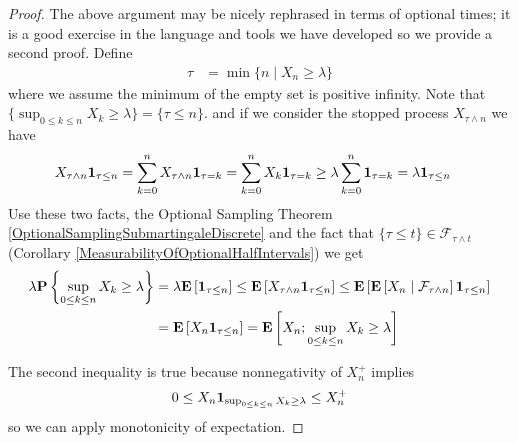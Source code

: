 \begin{proof}
The above argument may be nicely rephrased in terms of optional times; it is a good exercise in the language and tools we have developed so we provide a second proof.  Define
\begin{align*}
\tau &= \min \lbrace  n \mid X_n \geq \lambda \rbrace
\end{align*}
where we assume the minimum of the empty set is positive infinity. 
Note that $\lbrace \sup_{0 \leq k \leq n} X_k \geq \lambda
\rbrace = \lbrace \tau \leq n \rbrace$.  and if we consider the stopped
process $X_{\tau \wedge n}$ we have
\begin{align*}
X_{\tau  \wedge n} \characteristic{\tau \leq n} &= \sum_{k=0}^n X_{\tau \wedge n}
\characteristic{\tau = k}  = \sum_{k=0}^n X_k
\characteristic{\tau = k} \geq \lambda \sum_{k=0}^n
\characteristic{\tau = k} = \lambda \characteristic{\tau \leq n} 
\end{align*}
Use these two facts, the Optional Sampling Theorem \ref{OptionalSamplingSubmartingaleDiscrete} and the fact that $\lbrace \tau \leq t \rbrace \in \mathcal{F}_{\tau \wedge t}$ (Corollary \ref{MeasurabilityOfOptionalHalfIntervals}) we get
\begin{align*}
\lambda \probability{\sup_{0 \leq k \leq n} X_k \geq \lambda} &= \lambda \expectation{\characteristic{\tau \leq n}} 
\leq \expectation{X_{\tau \wedge n} \characteristic{\tau \leq n}} 
\leq \expectation{\cexpectationlong{\mathcal{F}_{\tau \wedge n}} {X_{n}} \characteristic{\tau \leq n}} \\
&=\expectation{X_{n} \characteristic{\tau \leq n}} = \expectation {X_n; \sup_{0 \leq k \leq n} X_k \geq \lambda}
\end{align*}

The second inequality is true because nonnegativity of $X_n^+$ implies 
\begin{align*}
0 \leq X_n
\characteristic{\sup_{0 \leq k \leq n} X_k \geq \lambda} \leq X_n^+
\end{align*} so we can apply
monotonicity of expectation.


\end{proof}
